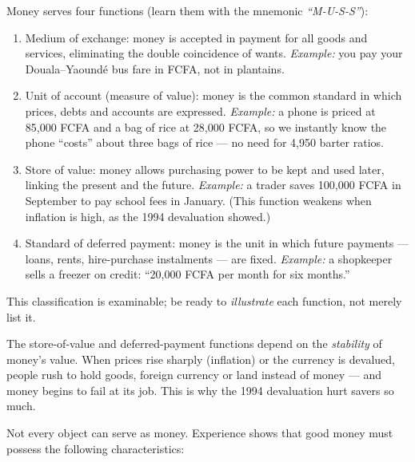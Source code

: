 \documentclass[11pt]{article}
\newcommand{\cle}[1]{{\popxbold\color{popdark}#1}}
\newcounter{popsec}
\newcounter{popsub}
\newcommand{\courssub}[1]{%
  \stepcounter{popsub}%
  \par\vspace{9pt}\noindent{\popxbold\fontsize{11.5}{13}\selectfont\color{popink}{\color{poporange}\thepopsec.\thepopsub}\hspace{6pt}#1}\par\nopagebreak\vspace{4pt}
}
\begin{document}
\begin{propriete}
Money serves four functions (learn them with the mnemonic \emph{``M-U-S-S''}):
\begin{enumerate}
\item \cle{Medium of exchange}: money is accepted in payment for all goods and services, eliminating the double coincidence of wants. \emph{Example:} you pay your Douala--Yaoundé bus fare in FCFA, not in plantains.
\item \cle{Unit of account} (measure of value): money is the common standard in which prices, debts and accounts are expressed. \emph{Example:} a phone is priced at 85,000 FCFA and a bag of rice at 28,000 FCFA, so we instantly know the phone ``costs'' about three bags of rice --- no need for 4,950 barter ratios.
\item \cle{Store of value}: money allows purchasing power to be kept and used later, linking the present and the future. \emph{Example:} a trader saves 100,000 FCFA in September to pay school fees in January. (This function weakens when inflation is high, as the 1994 devaluation showed.)
\item \cle{Standard of deferred payment}: money is the unit in which future payments --- loans, rents, hire-purchase instalments --- are fixed. \emph{Example:} a shopkeeper sells a freezer on credit: ``20,000 FCFA per month for six months.''
\end{enumerate}
This classification is examinable; be ready to \emph{illustrate} each function, not merely list it.
\end{propriete}

\begin{attention}
The store-of-value and deferred-payment functions depend on the \emph{stability} of money's value. When prices rise sharply (inflation) or the currency is devalued, people rush to hold goods, foreign currency or land instead of money --- and money begins to fail at its job. This is why the 1994 devaluation hurt savers so much.
\end{attention}

\courssub{The Qualities of Good Money}

Not every object can serve as money. Experience shows that good money must possess the following characteristics:
\end{document}

